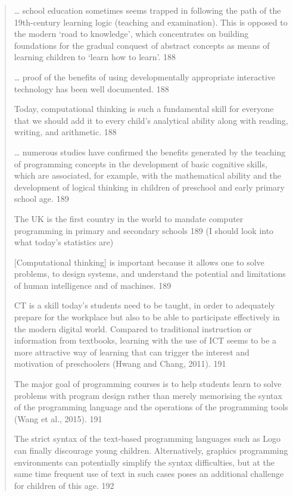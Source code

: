 \documentclass[12pt]{extarticle}
\begin{document}
\begin{quote}
    
    … school education sometimes seems trapped in following the path of the 19th-century learning logic (teaching and examination).  This is opposed to the modern ‘road to knowledge’, which concentrates on building foundations for the gradual conquest of abstract concepts as means of learning children to ‘learn how to learn’.	188
    
    … proof of the benefits of using developmentally appropriate interactive technology has been well documented.	188
    
    Today, computational thinking is such a fundamental skill for everyone that we should add it to every child’s analytical ability along with reading, writing, and arithmetic. 	188
    
    … numerous studies have confirmed the benefits generated by the teaching of programming concepts in the development of basic cognitive skills, which are associated, for example, with the mathematical ability and the development of logical thinking in children of preschool and early primary school age. 	189
    
    The UK is the first country in the world to mandate computer programming in primary and secondary schools 	189 (I should look into what today’s statistics are)
    
    [Computational thinking] is important because it allows one to solve problems, to design systems, and understand the potential and limitations of human intelligence and of machines.	189
    
    CT is a skill today’s students need to be taught, in order to adequately prepare for the workplace but also to be able to participate effectively in the modern digital world. 
    Compared to traditional instruction or information from textbooks, learning with the use of ICT seems to be a more attractive way of learning that can trigger the interest and motivation of preschoolers (Hwang and Chang, 2011). 	191
    
    The major goal of programming courses is to help students learn to solve problems with program design rather than merely memorising the syntax of the programming language and the operations of the programming tools (Wang et al., 2015).	191
    
    The strict syntax of the text-based programming languages such as Logo can finally discourage young children. Alternatively, graphics programming environments can potentially simplify the syntax difficulties, but at the same time frequent use of text in such cases poses an additional challenge for children of this age. 	192
    

\end{quote}
\end{document}
